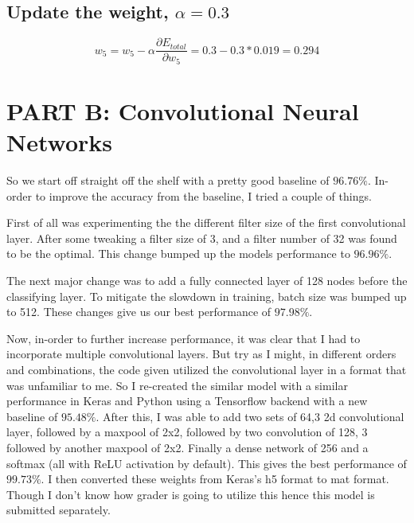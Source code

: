 \documentclass[a4paper, 11pt]{article}
\begin{document}
\subsection*{Update the weight, $\alpha = 0.3$}

$$w_5 = w_5 - \alpha \frac{\partial E_{total}}{\partial w_5} = 0.3 - 0.3 * 0.019 = 0.294$$

\section*{PART B: Convolutional Neural Networks}

So we start off straight off the shelf with a pretty good baseline of $96.76\%$. In-order to improve the accuracy from the baseline, I tried a couple of things. 

First of all was experimenting the the different filter size of the first convolutional layer. After some tweaking a filter size of 3, and a filter number of 32 was found to be the optimal. This change bumped up the models performance to $96.96\%$.

The next major change was to add a fully connected layer of 128 nodes before the classifying layer. To mitigate the slowdown in training, batch size was bumped up to 512. These changes give us our best performance of $97.98\%$.

Now, in-order to further increase performance, it was clear that I had to incorporate multiple convolutional layers. But try as I might, in different orders and combinations, the code given utilized the convolutional layer in a format that was unfamiliar to me. So I re-created the similar model with a similar performance in Keras and Python using a Tensorflow backend with a new baseline of $95.48\%$. After this, I was able to add two sets of 64,3 2d convolutional layer, followed by a maxpool of 2x2, followed by two convolution of 128, 3 followed by another maxpool of 2x2. Finally a dense network of 256 and a softmax (all with ReLU activation by default). This gives the best performance of $99.73\%$. I then converted these weights from Keras's h5 format to mat format. Though I don't know how grader is going to utilize this hence this model is submitted separately.
\end{document}

